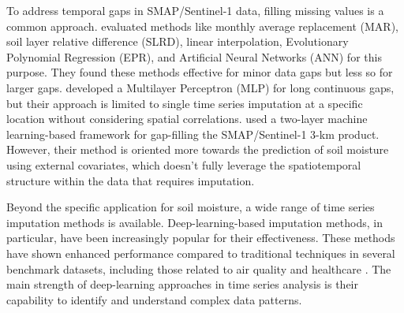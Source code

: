 \documentclass[11pt]{article}
\begin{document}
To address temporal gaps in SMAP/Sentinel-1 data, filling missing values is a common approach.  \citet{kornelsen2014comparison} evaluated methods like monthly average replacement (MAR), soil layer relative difference (SLRD), linear interpolation, Evolutionary Polynomial Regression (EPR), and Artificial Neural Networks (ANN) for this purpose. They found these methods effective for minor data gaps but less so for larger gaps. \cite{park2023long} developed a Multilayer Perceptron (MLP) for long continuous gaps, but their approach is limited to single time series imputation at a specific location without considering spatial correlations. \citet{mao2019gap} used a two-layer machine learning-based framework for gap-filling the SMAP/Sentinel-1 3-km product. However, their method is oriented more towards the prediction of soil moisture using external covariates, which doesn't fully leverage the spatiotemporal structure within the data that requires imputation.

 Beyond the specific application for soil moisture, a wide range of time series imputation methods is available. Deep-learning-based imputation methods, in particular, have been increasingly popular for their effectiveness. These methods have shown enhanced performance compared to traditional techniques in several benchmark datasets, including those related to air quality \citep{yi2016st} and healthcare \citep{silva2012predicting}. The main strength of deep-learning approaches in time series analysis is their capability to identify and understand complex data patterns. 
 
\end{document}
